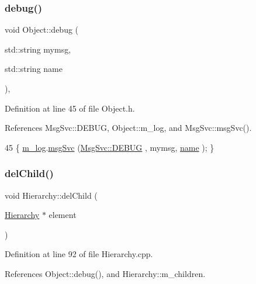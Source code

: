 \subsubsection{\texorpdfstring{debug()}{debug()}\hspace{0.1cm}{\footnotesize\ttfamily [2/2]}}
{\footnotesize\ttfamily void Object\+::debug (\begin{DoxyParamCaption}\item[{std\+::string}]{mymsg,  }\item[{std\+::string}]{name }\end{DoxyParamCaption})\hspace{0.3cm}{\ttfamily [inline]}, {\ttfamily [inherited]}}



Definition at line 45 of file Object.\+h.



References Msg\+Svc\+::\+D\+E\+B\+UG, Object\+::m\+\_\+log, and Msg\+Svc\+::msg\+Svc().


\begin{DoxyCode}
45 \{ \hyperlink{classObject_a0d269813dd7ac1f24bc143031e2963f2}{m\_log}.\hyperlink{classMsgSvc_ad25f18047920cc59a314e5098259711c}{msgSvc} (\hyperlink{classMsgSvc_ae671eb7301996cd049d2da8a65925926a1dbdcc82dce88370ec335883c83b38b0}{MsgSvc::DEBUG}   , mymsg, \hyperlink{classObject_a300f4c05dd468c7bb8b3c968868443c1}{name} ); \}
\end{DoxyCode}
\mbox{\label{classHierarchy_a2b2b359fac003233f65786a616766bde}} 
\subsubsection{\texorpdfstring{del\+Child()}{delChild()}\hspace{0.1cm}{\footnotesize\ttfamily [1/2]}}
{\footnotesize\ttfamily void Hierarchy\+::del\+Child (\begin{DoxyParamCaption}\item[{\hyperlink{classHierarchy}{Hierarchy} $\ast$}]{element }\end{DoxyParamCaption})\hspace{0.3cm}{\ttfamily [inherited]}}



Definition at line 92 of file Hierarchy.\+cpp.



References Object\+::debug(), and Hierarchy\+::m\+\_\+children.



